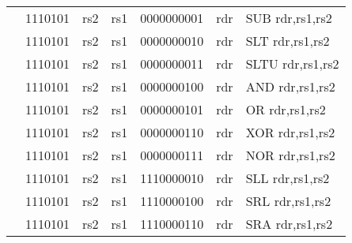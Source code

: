 \begin{table}[p]
\begin{small}
\begin{center}
\begin{tabular}{rcccccccccl}
&
\multicolumn{2}{|c|}{1110101} &
\multicolumn{1}{c|}{rs2} &
\multicolumn{1}{c|}{rs1} &
\multicolumn{4}{c|}{0000000001} &
\multicolumn{1}{c|}{rdr} & SUB rdr,rs1,rs2 \\
\cline{2-10}
  

&
\multicolumn{2}{|c|}{1110101} &
\multicolumn{1}{c|}{rs2} &
\multicolumn{1}{c|}{rs1} &
\multicolumn{4}{c|}{0000000010} &
\multicolumn{1}{c|}{rdr} & SLT rdr,rs1,rs2 \\
\cline{2-10}
  

&
\multicolumn{2}{|c|}{1110101} &
\multicolumn{1}{c|}{rs2} &
\multicolumn{1}{c|}{rs1} &
\multicolumn{4}{c|}{0000000011} &
\multicolumn{1}{c|}{rdr} & SLTU rdr,rs1,rs2 \\
\cline{2-10}
  

&
\multicolumn{2}{|c|}{1110101} &
\multicolumn{1}{c|}{rs2} &
\multicolumn{1}{c|}{rs1} &
\multicolumn{4}{c|}{0000000100} &
\multicolumn{1}{c|}{rdr} & AND rdr,rs1,rs2 \\
\cline{2-10}
  

&
\multicolumn{2}{|c|}{1110101} &
\multicolumn{1}{c|}{rs2} &
\multicolumn{1}{c|}{rs1} &
\multicolumn{4}{c|}{0000000101} &
\multicolumn{1}{c|}{rdr} & OR rdr,rs1,rs2 \\
\cline{2-10}
  

&
\multicolumn{2}{|c|}{1110101} &
\multicolumn{1}{c|}{rs2} &
\multicolumn{1}{c|}{rs1} &
\multicolumn{4}{c|}{0000000110} &
\multicolumn{1}{c|}{rdr} & XOR rdr,rs1,rs2 \\
\cline{2-10}
  

&
\multicolumn{2}{|c|}{1110101} &
\multicolumn{1}{c|}{rs2} &
\multicolumn{1}{c|}{rs1} &
\multicolumn{4}{c|}{0000000111} &
\multicolumn{1}{c|}{rdr} & NOR rdr,rs1,rs2 \\
\cline{2-10}
  

&
\multicolumn{2}{|c|}{1110101} &
\multicolumn{1}{c|}{rs2} &
\multicolumn{1}{c|}{rs1} &
\multicolumn{4}{c|}{1110000010} &
\multicolumn{1}{c|}{rdr} & SLL rdr,rs1,rs2 \\
\cline{2-10}
  

&
\multicolumn{2}{|c|}{1110101} &
\multicolumn{1}{c|}{rs2} &
\multicolumn{1}{c|}{rs1} &
\multicolumn{4}{c|}{1110000100} &
\multicolumn{1}{c|}{rdr} & SRL rdr,rs1,rs2 \\
\cline{2-10}
  

&
\multicolumn{2}{|c|}{1110101} &
\multicolumn{1}{c|}{rs2} &
\multicolumn{1}{c|}{rs1} &
\multicolumn{4}{c|}{1110000110} &
\multicolumn{1}{c|}{rdr} & SRA rdr,rs1,rs2 \\
\cline{2-10}
  


\end{tabular}
\end{center}
\end{small}
\end{table}
